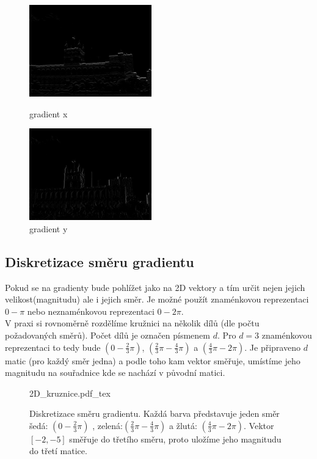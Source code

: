 \documentclass{report}
\begin{document}
\begin{figure}[H]
	\centering
	\begin{minipage}[c]{150pt}
		\centering
		\includegraphics[width=150pt]{./img/gradientX.png}
		\caption{gradient x}
	\end{minipage}
	\begin{minipage}[c]{150pt}
		\includegraphics[width=150pt]{./img/gradientY.png}
		\caption{gradient y}
		\centering
	\end{minipage}
\end{figure}

\subsection{Diskretizace směru gradientu}
Pokud se na gradienty bude pohlížet jako na 2D vektory a tím určit nejen jejich velikost(magnitudu) ale i jejich směr. Je možné použít znaménkovou reprezentaci $0 - \pi$ nebo neznaménkovou reprezentaci $0 - 2\pi$. \\
V praxi si rovnoměrně rozdělíme kružnici na několik dílů (dle počtu požadovaných směrů). Počet dílů  je označen písmenem $d$. Pro $d = 3$ znaménkovou reprezentaci to tedy bude $\left(0 - \frac{2}{3}\pi \right)$, $\left(\frac{2}{3}\pi - \frac{4}{3}\pi \right)$ a $\left(\frac{4}{3}\pi - 2\pi \right)$. Je připraveno $d$ matic (pro každý směr jedna) a podle toho kam vektor směřuje, umístíme jeho magnitudu na souřadnice kde se nachází v původní matici. 

\begin{figure}[H]
    \centering    
    \def\svgwidth{230pt}
	{2D_kruznice.pdf_tex}    
    \caption{Diskretizace směru gradientu. Každá barva představuje jeden směr šedá: $\left(0 - \frac{2}{3}\pi \right)$ , zelená:$\left(\frac{2}{3}\pi - \frac{4}{3}\pi \right)$ a žlutá: $\left(\frac{4}{3}\pi - 2\pi \right)$. Vektor $[ -2, -5 ]$ směřuje do třetího směru, proto uložíme jeho magnitudu do třetí matice. }
    \label{fig: 2D_graf}
\end{figure}
\end{document}
